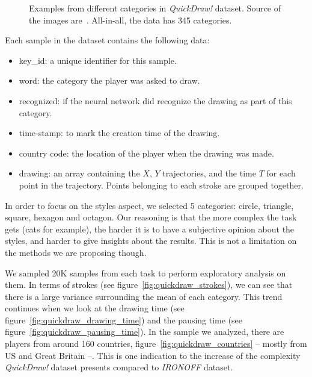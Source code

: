 \begin{figure}
    \centering
    \caption{Examples from different categories in \textit{QuickDraw!} dataset. Source of the images are~\citep{quickdraw}. All-in-all, the data has 345 categories.}
    \label{fig:quickdraw_preview}
\end{figure}


\par Each sample in the dataset contains the following data:

\begin{itemize}
    \item key\_id: a unique identifier for this sample.
    \item word: the category the player was asked to draw.
    \item recognized: if the neural network did recognize the drawing as part of this category.
    \item time-stamp: to mark the creation time of the drawing.
    \item country code: the location of the player when the drawing was made.
    \item drawing: an array containing the $X$, $Y$ trajectories, and the time $T$ for each point in the trajectory. Points belonging to each stroke are grouped together.
\end{itemize}

\par In order to focus on the styles aspect, we selected 5 categories: circle, triangle, square, hexagon and octagon. Our reasoning is that the more complex the task gets (cats for example), the harder it is to have a subjective opinion about the styles, and harder to give insights about the results. This is not a limitation on the methods we are proposing though.

\par We sampled 20K samples from each task to perform exploratory analysis on them. In terms of strokes (see figure~\ref{fig:quickdraw_strokes}), we can see that there is a large variance surrounding the mean of each category. This trend continues when we look at the drawing time (see figure~\ref{fig:quickdraw_drawing_time}) and the pausing time (see figure~\ref{fig:quickdraw_pausing_time}). In the sample we analyzed, there are players from around 160 countries, figure~\ref{fig:quickdraw_countries} -- mostly from US and Great Britain --. This is one indication to the increase of the complexity \textit{QuickDraw!} dataset presents compared to \textit{IRONOFF} dataset.

